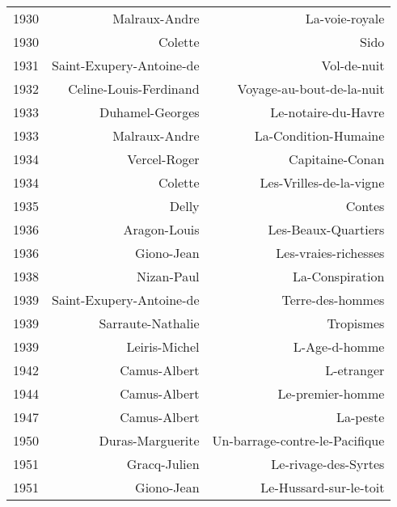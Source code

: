 \begin{xltabular}{\textwidth}{lrr}
1930 &                        Malraux-Andre &                        La-voie-royale \\
1930 &                              Colette &                                  Sido \\
1931 &             Saint-Exupery-Antoine-de &                           Vol-de-nuit \\
1932 &               Celine-Louis-Ferdinand &             Voyage-au-bout-de-la-nuit \\
1933 &                      Duhamel-Georges &                   Le-notaire-du-Havre \\
1933 &                        Malraux-Andre &                  La-Condition-Humaine \\
1934 &                         Vercel-Roger &                       Capitaine-Conan \\
1934 &                              Colette &               Les-Vrilles-de-la-vigne \\
1935 &                                Delly &                                Contes \\
1936 &                         Aragon-Louis &                   Les-Beaux-Quartiers \\
1936 &                           Giono-Jean &                  Les-vraies-richesses \\
1938 &                           Nizan-Paul &                       La-Conspiration \\
1939 &             Saint-Exupery-Antoine-de &                      Terre-des-hommes \\
1939 &                    Sarraute-Nathalie &                             Tropismes \\
1939 &                        Leiris-Michel &                         L-Age-d-homme \\
1942 &                         Camus-Albert &                            L-etranger \\
1944 &                         Camus-Albert &                      Le-premier-homme \\
1947 &                         Camus-Albert &                              La-peste \\
1950 &                     Duras-Marguerite &        Un-barrage-contre-le-Pacifique \\
1951 &                         Gracq-Julien &                  Le-rivage-des-Syrtes \\
1951 &                           Giono-Jean &                Le-Hussard-sur-le-toit \\

\end{xltabular}
